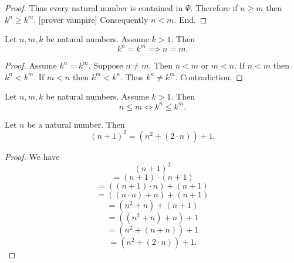 \documentclass[../arithmetic.tex]{subfiles}
\begin{document}
\begin{forthel}
\begin{proof}
        Thus every natural number is contained in $\Psi$.
        Therefore if $n \geq m$ then $k^{n} \geq k^{m}$.
        [prover vampire]
        Consequently $n < m$.
      End.
    \end{proof}
  \end{forthel}

  \begin{forthel}
    \begin{corollary}
      Let $n, m, k$ be natural numbers.
      Assume $k > 1$.
      Then \[ k^{n} = k^{m} \implies n = m. \]
    \end{corollary}
    \begin{proof}
      Assume $k^{n} = k^{m}$.
      Suppose $n \neq m$.
      Then $n < m$ or $m < n$.
      If $n < m$ then $k^{n} < k^{m}$.
      If $m < n$ then $k^{m} < k^{n}$.
      Thus $k^{n} \neq k^{m}$.
      Contradiction.
    \end{proof}
  \end{forthel}

  \begin{forthel}
    \begin{corollary}
      Let $n, m, k$ be natural numbers.
      Assume $k > 1$.
      Then \[ n \leq m \iff k^{n} \leq k^{m}. \]
    \end{corollary}
  \end{forthel}

  \begin{forthel}
    \begin{proposition}
      Let $n$ be a natural number.
      Then \[ (n + 1)^{2} = (n^{2} + (2 \cdot n)) + 1. \]
    \end{proposition}
    \begin{proof}
      We have
      \[  (n + 1)^{2}                       \]
      \[    = (n + 1) \cdot (n + 1)         \]
      \[    = ((n + 1) \cdot n) + (n + 1)   \]
      \[    = ((n \cdot n) + n) + (n + 1)   \]
      \[    = (n^{2} + n) + (n + 1)         \]
      \[    = ((n^{2} + n) + n) + 1         \]
      \[    = (n^{2} + (n + n)) + 1         \]
      \[    = (n^{2} + (2 \cdot n)) + 1.    \]
    \end{proof}
  \end{forthel}
\end{document}

